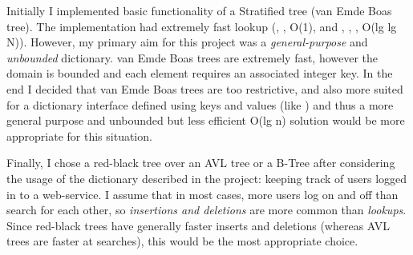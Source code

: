 Initially I implemented basic functionality of a Stratified tree (van Emde Boas tree). The implementation had extremely fast lookup (, ,  O(1), and , , ,  O(lg lg N)). However, my primary aim for this project was a \textit{general-purpose} and \textit{unbounded} dictionary. van Emde Boas trees are extremely fast, however the domain is bounded and each element requires an associated integer key. In the end I decided that van Emde Boas trees are too restrictive, and also more suited for a dictionary interface defined using keys and values (like ) and thus a more general purpose and unbounded but less efficient O(lg n) solution would be more appropriate for this situation.

Finally, I chose a red-black tree over an AVL tree or a B-Tree after considering the usage of the dictionary described in the project: keeping track of users logged in to a web-service. I assume that in most cases, more users log on and off than search for each other, so \textit{insertions and deletions} are more common than \textit{lookups}. Since red-black trees have generally faster inserts and deletions (whereas AVL trees are faster at searches), this would be the most appropriate choice.
